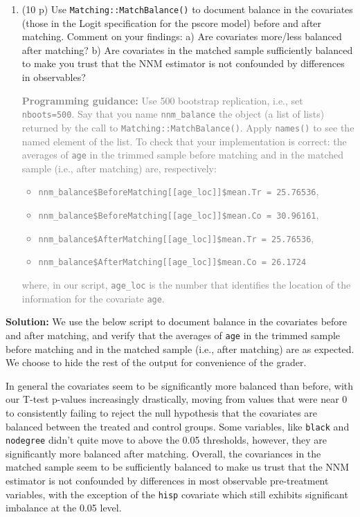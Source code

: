 \documentclass[
]{article}
\providecommand{\tightlist}{%
  \setlength{\itemsep}{0pt}\setlength{\parskip}{0pt}}
\begin{document}
\begin{enumerate}
\def\labelenumi{\arabic{enumi}.}
\setcounter{enumi}{7}
\tightlist
\item
  (10 p) Use \texttt{Matching::MatchBalance()} to document balance in
  the covariates (those in the Logit specification for the pscore model)
  before and after matching. Comment on your findings: a) Are covariates
  more/less balanced after matching? b) Are covariates in the matched
  sample sufficiently balanced to make you trust that the NNM estimator
  is not confounded by differences in observables?

  \textcolor{gray}{\textbf{Programming guidance:} Use 500 bootstrap replication, i.e., set \texttt{nboots=500}. Say that you name \texttt{nnm\_balance} the object (a list of lists) returned by the call to \texttt{Matching::MatchBalance()}. Apply \texttt{names()} to see the named element of the list. To check that your implementation is correct: the averages of \texttt{age} in the trimmed sample before matching and in the matched sample (i.e., after matching) are, respectively:
   \begin{itemize}
   \item \texttt{nnm\_balance\$BeforeMatching[[age\_loc]]\$mean.Tr = 25.76536}, 
   \item \texttt{nnm\_balance\$BeforeMatching[[age\_loc]]\$mean.Co = 30.96161},
   \item \texttt{nnm\_balance\$AfterMatching[[age\_loc]]\$mean.Tr = 25.76536},
   \item \texttt{nnm\_balance\$AfterMatching[[age\_loc]]\$mean.Co = 26.1724}
   \end{itemize}
  where, in our script, \texttt{age\_loc} is the number that identifies the location of the information for the covariate \texttt{age}.}
\end{enumerate}

\textbf{Solution:} We use the below script to document balance in the
covariates before and after matching, and verify that the averages of
\texttt{age} in the trimmed sample before matching and in the matched
sample (i.e., after matching) are as expected. We choose to hide the
rest of the output for convenience of the grader.

In general the covariates seem to be significantly more balanced than
before, with our T-test p-values increasingly drastically, moving from
values that were near 0 to consistently failing to reject the null
hypothesis that the covariates are balanced between the treated and
control groups. Some variables, like \texttt{black} and
\texttt{nodegree} didn't quite move to above the 0.05 thresholds,
however, they are significantly more balanced after matching. Overall,
the covariances in the matched sample seem to be sufficiently balanced
to make us trust that the NNM estimator is not confounded by differences
in most observable pre-treatment variables, with the exception of the
\texttt{hisp} covariate which still exhibits significant imbalance at
the 0.05 level.
\end{document}
